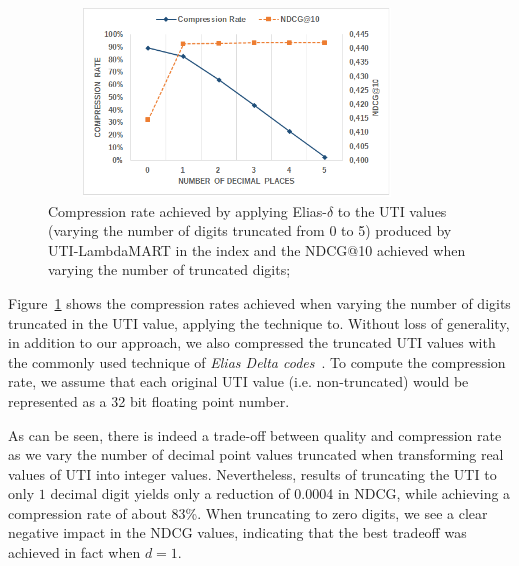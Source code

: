 \documentclass[preprint,review,10pt,3p]{elsarticle}
\begin{document}
\begin{figure}[ht!]
\centering
\includegraphics[width=10cm, height=5cm]{im_cr_ndcg_lambda.png}
\caption{Compression rate achieved by applying Elias-$\delta$ to the UTI values (varying the number of digits truncated from 0 to 5) produced by UTI-LambdaMART in the index and the NDCG@10 achieved when varying the number of truncated digits;}
\label{fig:crq}
\end{figure}

Figure~\ref{fig:crq} shows the compression rates achieved when varying the number of digits truncated in the UTI value, applying the technique to. Without loss of generality, in addition to our approach, we also compressed the truncated UTI values with the commonly used technique of \textit{Elias Delta codes}~\cite{elias1975universal}. To compute the compression rate, we assume that each original UTI value (i.e. non-truncated) would be represented as a 32 bit floating point number. 

As can be seen, there is indeed a trade-off between quality and compression rate as we vary the number of decimal point values truncated when transforming real values of UTI into integer values.
Nevertheless, results of truncating the UTI to only $1$ decimal digit yields only a reduction of 0.0004 in NDCG, while achieving a compression rate of about 83\%.
When truncating to zero digits, we see a clear negative impact in the NDCG values, indicating that the best tradeoff was achieved in fact when $d=1$.









\end{document}
